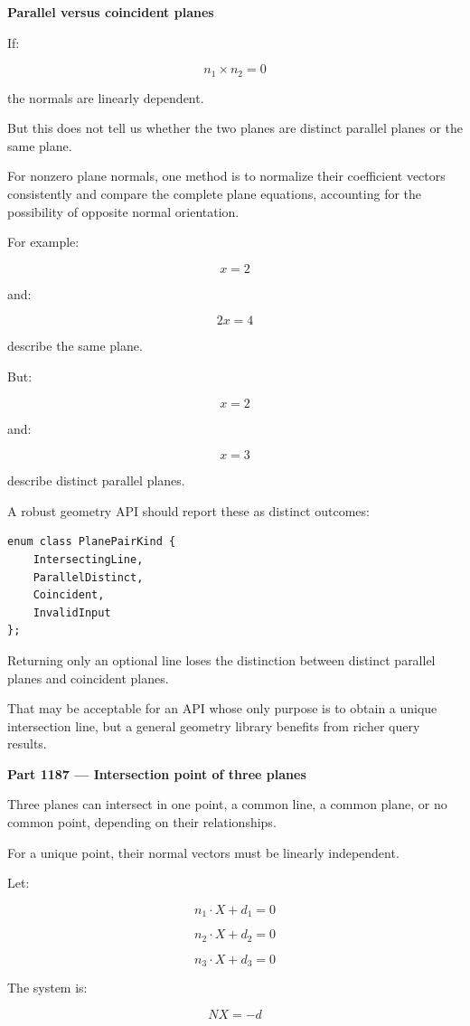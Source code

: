 \textbf{Parallel versus coincident planes}

If:

\[
n_1\times n_2=0
\]

the normals are linearly dependent.

But this does not tell us whether the two planes are distinct parallel planes or the same plane.

For nonzero plane normals, one method is to normalize their coefficient vectors consistently and compare the complete plane equations, accounting for the possibility of opposite normal orientation.

For example:

\[
x=2
\]

and:

\[
2x=4
\]

describe the same plane.

But:

\[
x=2
\]

and:

\[
x=3
\]

describe distinct parallel planes.

A robust geometry API should report these as distinct outcomes:

\begin{verbatim}
enum class PlanePairKind {
    IntersectingLine,
    ParallelDistinct,
    Coincident,
    InvalidInput
};
\end{verbatim}

Returning only an optional line loses the distinction between distinct parallel planes and coincident planes.

That may be acceptable for an API whose only purpose is to obtain a unique intersection line, but a general geometry library benefits from richer query results.

\textbf{Part 1187 --- Intersection point of three planes}

Three planes can intersect in one point, a common line, a common plane, or no common point, depending on their relationships.

For a unique point, their normal vectors must be linearly independent.

Let:

\[
n_1\cdot X+d_1=0
\]

\[
n_2\cdot X+d_2=0
\]

\[
n_3\cdot X+d_3=0
\]

The system is:

\[
NX=-d
\]

